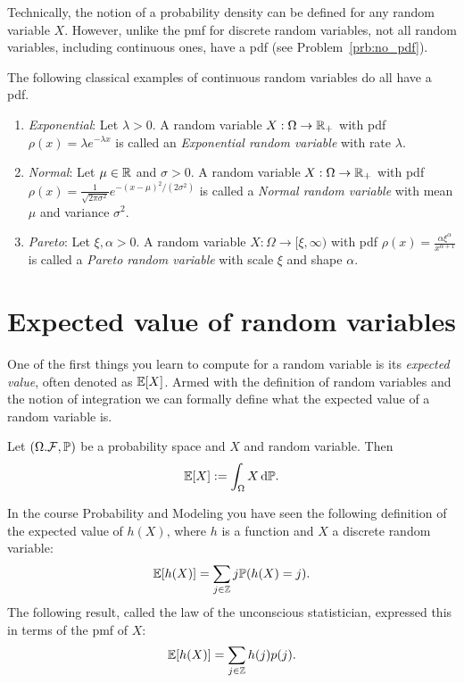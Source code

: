 Technically, the notion of a probability density can be defined for any random variable $X$. However, unlike the pmf for discrete random variables, not all random variables, including continuous ones, have a pdf (see Problem~\ref{prb:no_pdf}).

The following classical examples of continuous random variables do all have a pdf.

\begin{example}\hfill
\begin{enumerate}[label=(\alph*)]
\item \textit{Exponential}: Let $\lambda > 0$. A random variable $X : \Omega \to \mathbb R_+$ with pdf $\rho(x) = \lambda e^{-\lambda x}$ is called an \emph{Exponential random variable} with rate $\lambda$.
\item \textit{Normal}: Let $\mu \in \mathbb R$ and $\sigma > 0$. A random variable $X : \Omega \to \mathbb R_+$ with pdf $\rho(x) = \frac{1}{\sqrt{2 \pi \sigma^2}} e^{-(x - \mu)^2/(2\sigma^2)}$ is called a \emph{Normal random variable} with mean $\mu$ and variance $\sigma^2$.
\item \textit{Pareto}: Let $\xi, \alpha > 0$. A random variable $X : \Omega \to [\xi, \infty)$ with pdf $\rho(x) = \frac{\alpha \xi^\alpha}{x^{\alpha +1}}$ is called a \emph{Pareto random variable} with scale $\xi$ and shape $\alpha$.
\end{enumerate} 
\end{example}



\section{Expected value of random variables}

One of the first things you learn to compute for a random variable is its \emph{expected value}, often denoted as $\mathbb E[X]$. Armed with the definition of random variables and the notion of integration we can formally define what the expected value of a random variable is.

\begin{definition}\label{def:expectation_random_variable}
Let $(\Omega. \mathcal F, \mathbb P)$ be a probability space and $X$ and random variable. Then
\[
	\mathbb E[X] := \int_\Omega X \, \mathrm{d} \mathbb P.
\]
\end{definition}



In the course Probability and Modeling you have seen the following definition of the expected value of $h(X)$, where $h$ is a function and $X$ a discrete random variable:
\[
	\mathbb E[h(X)] = \sum_{j \in \mathbb Z} j \mathbb P(h(X) = j).
\]
The following result, called the law of the unconscious statistician, expressed this in terms of the pmf of $X$:
\[
	\mathbb E[h(X)] = \sum_{j \in \mathbb Z} h(j) p(j).
\] 

